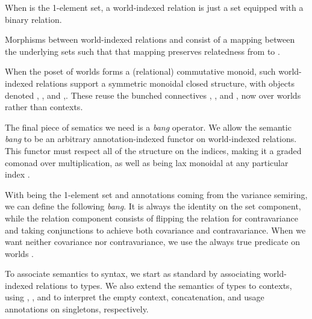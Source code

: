 
\begin{example}
  When  is the 1-element set, a world-indexed relation is just a
  set equipped with a binary relation.
\end{example}

Morphisms between world-indexed relations  and 
consist of a mapping between the underlying sets such that that mapping
preserves relatedness from  to .


When the poset of worlds forms a (relational) commutative monoid, such
world-indexed relations support a symmetric monoidal closed structure, with
objects denoted ,
, and
,.
These reuse the bunched connectives , \AgdaRecord{$\sep$}, and
\AgdaRecord{$\wand$}, now over worlds rather than contexts.


The final piece of sematics we need is a \emph{bang} operator.
We allow the
semantic \emph{bang} to be an arbitrary annotation-indexed functor on
world-indexed relations.
This functor must respect all of the structure on the indices, making it a
graded comonad over multiplication, as well as being lax monoidal at any
particular index .


\begin{example}
  With  being the 1-element set and annotations coming from the
  variance semiring, we can define the following \emph{bang}.
  It is always the identity on the set component, while the relation component
  consists of flipping the relation for contravariance and taking conjunctions
  to achieve both covariance and contravariance.
  When we want neither covariance nor contravariance, we use the always true
  predicate on worlds .

\end{example}

To associate semantics to syntax, we start as standard by associating
world-indexed relations to types.
We also extend the semantics of types to contexts, using ,
, and  to interpret the empty
context, concatenation, and usage annotations on singletons, respectively.

